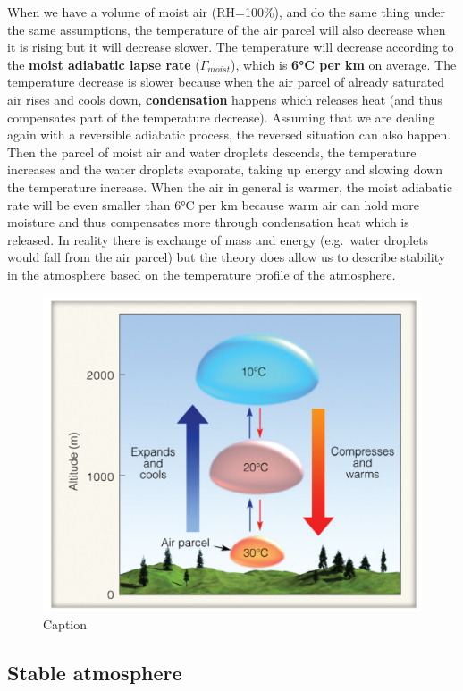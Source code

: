 \documentclass[12pt,oneside]{book}
\begin{document}
When we have a volume of moist air (RH=100\%), and do the same thing
under the same assumptions, the temperature of the air parcel will also
decrease when it is rising but it will decrease slower. The temperature
will decrease according to the \textbf{moist adiabatic lapse rate}
(\(\Gamma_{moist}\)), which is \textbf{6°C per km} on average. The
temperature decrease is slower because when the air parcel of already
saturated air rises and cools down, \textbf{condensation} happens which
releases heat (and thus compensates part of the temperature decrease).
Assuming that we are dealing again with a reversible adiabatic process,
the reversed situation can also happen. Then the parcel of moist air and
water droplets descends, the temperature increases and the water
droplets evaporate, taking up energy and slowing down the temperature
increase. When the air in general is warmer, the moist adiabatic rate
will be even smaller than 6°C per km because warm air can hold more
moisture and thus compensates more through condensation heat which is
released. In reality there is exchange of mass and energy (e.g.~water
droplets would fall from the air parcel) but the theory does allow us to
describe stability in the atmosphere based on the temperature profile of
the atmosphere.

\begin{figure}

{\centering \includegraphics[width=0.6\linewidth]{figures/Figure32} 

}

\caption{Caption}\label{fig:Expand}
\end{figure}

\subsection{Stable atmosphere}\label{stable-atmosphere}
\end{document}
